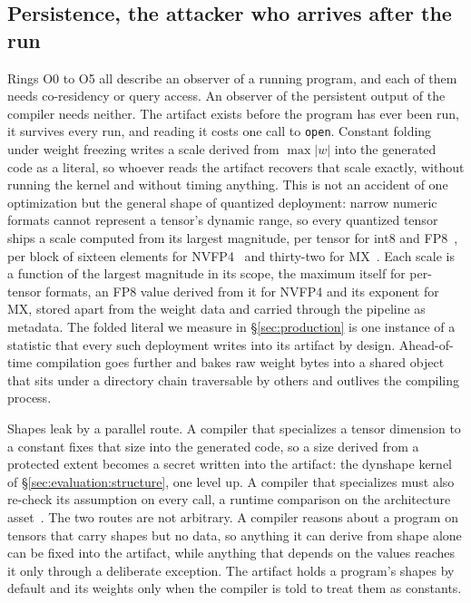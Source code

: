 \subsection{Persistence, the attacker who arrives after the run}
\label{sec:threat:persistence}
Rings O0 to O5 all describe an observer of a running program, and each
of them needs co-residency or query access. An observer of the
persistent output of the compiler needs neither. The artifact exists
before the program has ever been run, it survives every run, and
reading it costs one call to \texttt{open}. Constant folding under
weight freezing writes a scale derived from $\max|w|$ into the generated
code as a literal, so whoever reads the artifact recovers that scale
exactly, without running the kernel and without timing anything. This
is not an accident of one optimization but the general shape of
quantized deployment: narrow numeric formats cannot represent a
tensor's dynamic range, so every quantized tensor ships a scale computed
from its largest magnitude, per tensor for int8 and
FP8~\cite{fp8formats}, per block of sixteen elements for
NVFP4~\cite{nvfp4} and thirty-two for MX~\cite{ocpmx}. Each scale is a function of the largest
magnitude in its scope, the maximum itself for per-tensor formats, an
FP8 value derived from it for NVFP4 and its exponent for MX, stored apart from the weight data and carried
through the pipeline as metadata. The folded literal we measure in
\S\ref{sec:production} is one instance of a statistic that every such
deployment writes into its artifact by design. Ahead-of-time
compilation goes further and bakes raw weight bytes into a shared
object that sits under a directory chain traversable by others and
outlives the compiling process.
 
Shapes leak by a parallel route. A compiler that specializes a tensor
dimension to a constant fixes that size into the generated code, so a
size derived from a protected extent becomes a secret written into the
artifact: the dynshape kernel of \S\ref{sec:evaluation:structure}, one level up. A
compiler that specializes must also re-check its assumption on every
call, a runtime comparison on the architecture
asset~\cite{pytorch2}. The two routes are not arbitrary. A compiler
reasons about a program on tensors that carry shapes but no data, so
anything it can derive from shape alone can be fixed into the artifact,
while anything that depends on the values reaches it only through a
deliberate exception. The artifact holds a program's shapes by default
and its weights only when the compiler is told to treat them as
constants.
 
